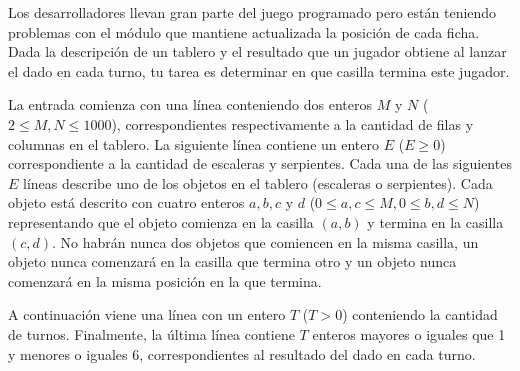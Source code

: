 \documentclass{oci}
\begin{document}
\begin{problemDescription}
  \begin{figure}
    \centering
    \begin{subfigure}{0.45\textwidth}
      \centering
    \end{subfigure}
    \begin{subfigure}{0.45\textwidth}
      \centering
    \end{subfigure}
  \end{figure}

  Los desarrolladores llevan gran parte del juego programado pero están teniendo
  problemas con el módulo que mantiene actualizada la posición de cada ficha.
  Dada la descripción de un tablero y el resultado que un jugador obtiene al
  lanzar el dado en cada turno, tu tarea es determinar en que casilla termina
  este jugador.
\end{problemDescription}

\begin{inputDescription}
  La entrada comienza con una línea conteniendo dos enteros $M$ y $N$ ($2 \leq
  M, N \leq 1000$), correspondientes respectivamente a la cantidad de filas y
  columnas en el tablero.
  La siguiente línea contiene un entero $E$ ($E \geq 0$) correspondiente a la
  cantidad de escaleras y serpientes.
  Cada una de las siguientes $E$ líneas describe uno de los objetos en el
  tablero (escaleras o serpientes).
  Cada objeto está descrito con cuatro enteros $a, b, c$ y $d$ ($0 \leq a, c
  \leq M, 0 \leq b, d \leq N$)
  representando que el objeto comienza en la casilla $(a, b)$ y termina en la
  casilla $(c, d)$.
  No habrán nunca dos objetos que comiencen en la misma casilla, un objeto
  nunca comenzará en la casilla que termina otro y un objeto nunca comenzará en
  la misma posición en la que termina.

  A continuación viene una línea con un entero $T$ ($T > 0$) conteniendo la
  cantidad de turnos.
  Finalmente, la última línea contiene $T$ enteros mayores o iguales que 1 y
  menores o iguales 6, correspondientes al resultado del dado en cada turno.
\end{inputDescription}
\end{document}
